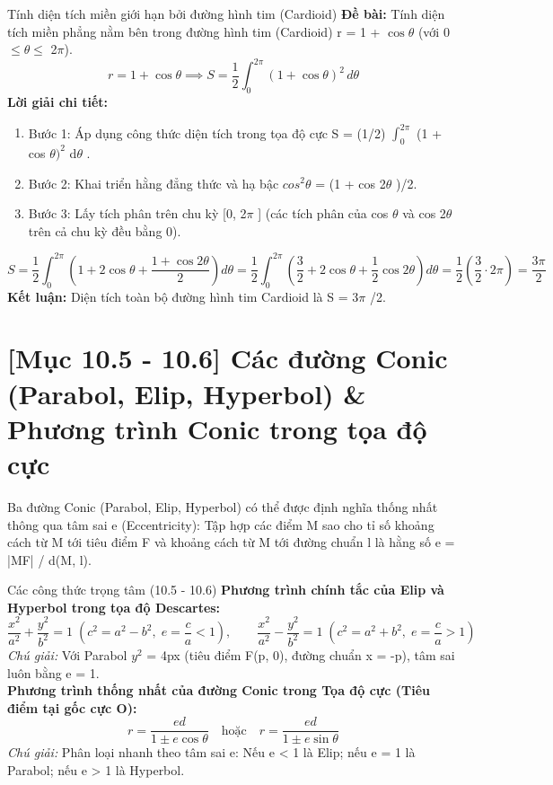 \documentclass[11pt,a4paper,oneside]{book}
\begin{document}
\begin{vidu}{Tính diện tích miền giới hạn bởi đường hình tim (Cardioid)}
\textbf{Đề bài:} Tính diện tích miền phẳng nằm bên trong đường hình tim (Cardioid) r = 1 + $\cos \theta$ (với 0 $\le \theta \le$ 2$\pi$).
\[ r = 1 + \cos\theta \implies S = \frac{1}{2}\int_0^{2\pi} (1 + \cos\theta)^2\,d\theta \]
\textbf{Lời giải chi tiết:}
\begin{enumerate}[leftmargin=1.5em, itemsep=2pt]
  \item Bước 1: Áp dụng công thức diện tích trong tọa độ cực S = (1/2) $\int_0^{2\pi }$ (1 + cos $\theta )^2$ d$\theta$ .
  \item Bước 2: Khai triển hằng đẳng thức và hạ bậc $cos^2 \theta$  = (1 + cos 2$\theta$ )/2.
  \item Bước 3: Lấy tích phân trên chu kỳ [0, 2$\pi$ ] (các tích phân của cos $\theta$  và cos 2$\theta$  trên cả chu kỳ đều bằng 0).
\end{enumerate}
\[ S = \frac{1}{2} \int_0^{2\pi} \left(1 + 2\cos\theta + \frac{1 + \cos 2\theta}{2}\right) d\theta = \frac{1}{2} \int_0^{2\pi} \left(\frac{3}{2} + 2\cos\theta + \frac{1}{2}\cos 2\theta\right) d\theta = \frac{1}{2}\left(\frac{3}{2}\cdot 2\pi\right) = \frac{3\pi}{2} \]
\noindent\textbf{Kết luận:} Diện tích toàn bộ đường hình tim Cardioid là S = 3$\pi$ /2.
\end{vidu}

\section{[Mục 10.5 - 10.6] Các đường Conic (Parabol, Elip, Hyperbol) \& Phương trình Conic trong tọa độ cực}
Ba đường Conic (Parabol, Elip, Hyperbol) có thể được định nghĩa thống nhất thông qua tâm sai e (Eccentricity): Tập hợp các điểm M sao cho tỉ số khoảng cách từ M tới tiêu điểm F và khoảng cách từ M tới đường chuẩn l là hằng số e = |MF| / d(M, l).

\begin{congthuc}{Các công thức trọng tâm (10.5 - 10.6)}
\noindent\textbf{Phương trình chính tắc của Elip và Hyperbol trong tọa độ Descartes:}
\[ \frac{x^2}{a^2} + \frac{y^2}{b^2} = 1 \;\left(c^2 = a^2 - b^2, \; e = \frac{c}{a} < 1\right), \qquad \frac{x^2}{a^2} - \frac{y^2}{b^2} = 1 \;\left(c^2 = a^2 + b^2, \; e = \frac{c}{a} > 1\right) \]
\noindent\textit{Chú giải:} Với Parabol $y^2$ = 4px (tiêu điểm F(p, 0), đường chuẩn x = -p), tâm sai luôn bằng e = 1.\\[4pt]
\noindent\textbf{Phương trình thống nhất của đường Conic trong Tọa độ cực (Tiêu điểm tại gốc cực O):}
\[ r = \frac{ed}{1 \pm e\cos\theta} \quad \text{hoặc} \quad r = \frac{ed}{1 \pm e\sin\theta} \]
\noindent\textit{Chú giải:} Phân loại nhanh theo tâm sai e: Nếu e < 1 là Elip; nếu e = 1 là Parabol; nếu e > 1 là Hyperbol.\\[4pt]
\end{congthuc}
\end{document}
